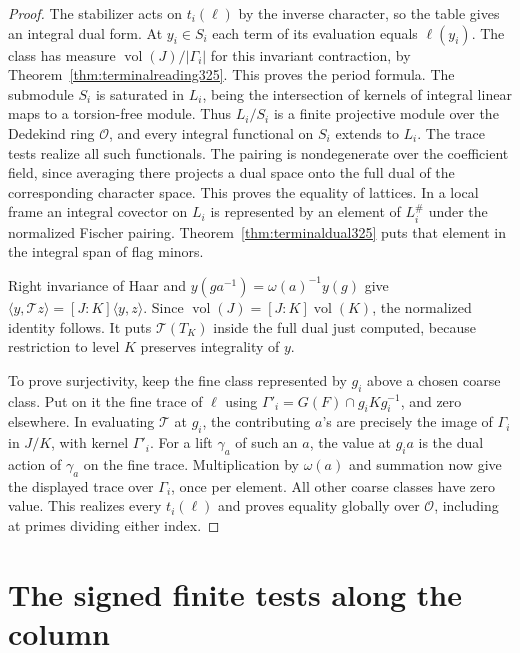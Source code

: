 \documentclass[a4paper,11pt]{article}
\theoremstyle{definition}
\theoremstyle{remark}
\numberwithin{equation}{section}
\begin{document}
\begin{proof}
The stabilizer acts on \(t_i(\ell)\) by the inverse character,
so the table gives an integral dual form. At \(y_i\in S_i\)
each term of its evaluation equals \(\ell(y_i)\). The class
has measure \(\operatorname{vol}(J)/|\Gamma_i|\) for this
invariant contraction, by Theorem~\ref{thm:terminalreading325}.
This proves the period formula. The submodule \(S_i\) is
saturated in \(L_i\), being the intersection of kernels
of integral linear maps to a torsion-free module. Thus
\(L_i/S_i\) is a finite projective module over the Dedekind
ring \(\mathcal O\), and every integral functional on
\(S_i\) extends to \(L_i\). The trace tests realize all
such functionals. The pairing is nondegenerate over the
coefficient field, since averaging there projects a dual
space onto the full dual of the corresponding character
space. This proves the equality of lattices. In a local
frame an integral covector on \(L_i\) is represented by
an element of \(L_i^\#\) under the normalized Fischer
pairing. Theorem~\ref{thm:terminaldual325} puts that
element in the integral span of flag minors.

Right invariance of Haar and \(y(ga^{-1})=\omega(a)^{-1}y(g)\)
give \(\langle y,\mathcal Tz\rangle=[J:K]\langle y,z\rangle\).
Since \(\operatorname{vol}(J)=[J:K]\operatorname{vol}(K)\),
the normalized identity follows. It puts \(\mathcal T(T_K)\)
inside the full dual just computed, because restriction to
level \(K\) preserves integrality of \(y\).

To prove surjectivity, keep the fine class represented by
\(g_i\) above a chosen coarse class. Put on it the fine
trace of \(\ell\) using \(\Gamma'_i=G(F)\cap g_iKg_i^{-1}\),
and zero elsewhere. In evaluating \(\mathcal T\) at \(g_i\),
the contributing \(a\)'s are precisely the image of
\(\Gamma_i\) in \(J/K\), with kernel \(\Gamma'_i\). For
a lift \(\gamma_a\) of such an \(a\), the value at \(g_i a\)
is the dual action of \(\gamma_a\) on the fine trace.
Multiplication by \(\omega(a)\) and summation now give
the displayed trace over \(\Gamma_i\), once per element.
All other coarse classes have zero value. This realizes
every \(t_i(\ell)\) and proves equality globally over
\(\mathcal O\), including at primes dividing either index.
\end{proof}

\section{The signed finite tests along the column}\label{nav:g-XII-2}
\end{document}
